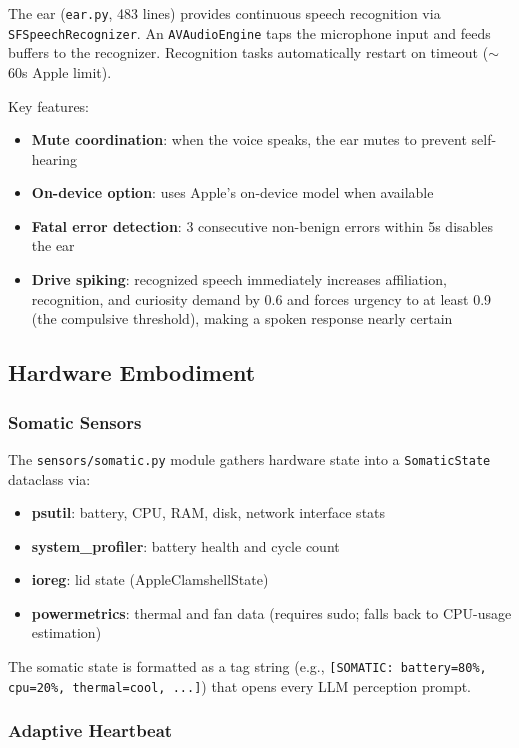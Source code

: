 \documentclass[11pt,oneside]{article}
\begin{document}
The ear (\texttt{ear.py}, 483 lines) provides continuous speech recognition via \texttt{SFSpeechRecognizer}.
An \texttt{AVAudioEngine} taps the microphone input and feeds buffers to the recognizer.
Recognition tasks automatically restart on timeout ($\sim$60s Apple limit).

Key features:
\begin{itemize}
  \item \textbf{Mute coordination}: when the voice speaks, the ear mutes to prevent self-hearing
  \item \textbf{On-device option}: uses Apple's on-device model when available
  \item \textbf{Fatal error detection}: 3 consecutive non-benign errors within 5s disables the ear
  \item \textbf{Drive spiking}: recognized speech immediately increases affiliation, recognition, and curiosity demand by 0.6 and forces urgency to at least 0.9 (the compulsive threshold), making a spoken response nearly certain
\end{itemize}

\subsection{Hardware Embodiment}

\subsubsection{Somatic Sensors}

The \texttt{sensors/somatic.py} module gathers hardware state into a \texttt{SomaticState} dataclass via:

\begin{itemize}
  \item \textbf{psutil}: battery, CPU, RAM, disk, network interface stats
  \item \textbf{system\_profiler}: battery health and cycle count
  \item \textbf{ioreg}: lid state (AppleClamshellState)
  \item \textbf{powermetrics}: thermal and fan data (requires sudo; falls back to CPU-usage estimation)
\end{itemize}

The somatic state is formatted as a tag string (e.g., \texttt{[SOMATIC: battery=80\%, cpu=20\%, thermal=cool, ...]}) that opens every LLM perception prompt.

\subsubsection{Adaptive Heartbeat}
\end{document}
